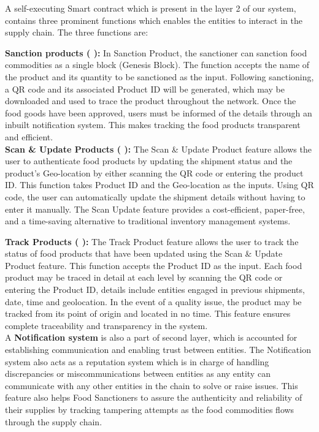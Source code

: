 \documentclass[12pt,a4paper,twocolumn,fleqn]{article}
\begin{document}
A self-executing Smart contract which is present in the layer 2 of our system, contains three prominent functions which enables the entities to interact in the supply chain. The three functions are: 

\textbf{Sanction products ( ):} In Sanction Product, the sanctioner can sanction food commodities as a single block (Genesis Block). The function accepts the name of the product and its quantity to be sanctioned as the input. Following sanctioning, a QR code and its associated Product ID will be generated, which may be downloaded and used to trace the product throughout the network. Once the food goods have been approved, users must be informed of the details through an inbuilt notification system. This makes tracking the food products transparent and efficient.  \\

\textbf{Scan \& Update Products ( ):} The Scan \& Update Product feature allows the user to authenticate food products by updating the shipment status and the product's Geo-location by either scanning the QR code or entering the product ID. This function takes Product ID and the Geo-location as the inputs. Using QR code, the user can automatically update the shipment details without having to enter it manually. The Scan Update feature provides a cost-efficient, paper-free, and a time-saving alternative to traditional inventory management systems. 

\textbf{Track Products ( ):} The Track Product feature allows the user to track the status of food products that have been updated using the Scan \& Update Product feature. This function accepts the Product ID as the input. Each food product may be traced in detail at each level by scanning the QR code or entering the Product ID, details include entities engaged in previous shipments, date, time and geolocation. In the event of a quality issue, the product may be tracked from its point of origin and located in no time. This feature ensures complete traceability and transparency in the system. \\

A \textbf{Notification system} is also a part of second layer, which is accounted for establishing communication and enabling trust between entities. The Notification system also acts as a reputation system which is in charge of handling discrepancies or miscommunications between entities as any entity can communicate with any other entities in the chain to solve or raise issues. This feature also helps Food Sanctioners to assure the authenticity and reliability of their supplies by tracking tampering attempts as the food commodities flows through the supply chain. \\
\end{document}
